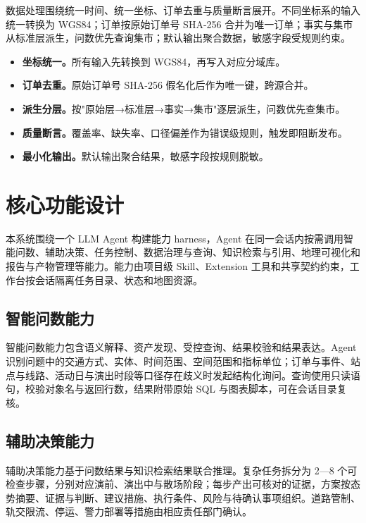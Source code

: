 \documentclass[a4paper,11pt]{article}
\newcommand{\term}[1]{\textbf{#1}}
\begin{document}
数据处理围绕统一时间、统一坐标、订单去重与质量断言展开。不同坐标系的输入统一转换为 WGS84；订单按原始订单号 SHA-256 合并为唯一订单；事实与集市从标准层派生，问数优先查询集市；默认输出聚合数据，敏感字段受规则约束。

\begin{itemize}
  \item \term{坐标统一。}所有输入先转换到 WGS84，再写入对应分域库。
  \item \term{订单去重。}原始订单号 SHA-256 假名化后作为唯一键，跨源合并。
  \item \term{派生分层。}按"原始层→标准层→事实→集市"逐层派生，问数优先查集市。
  \item \term{质量断言。}覆盖率、缺失率、口径偏差作为错误级规则，触发即阻断发布。
  \item \term{最小化输出。}默认输出聚合结果，敏感字段按规则脱敏。
\end{itemize}

\section{核心功能设计}

本系统围绕一个 LLM Agent 构建能力 harness，Agent 在同一会话内按需调用智能问数、辅助决策、任务控制、数据治理与查询、知识检索与引用、地理可视化和报告与产物管理等能力。能力由项目级 Skill、Extension 工具和共享契约约束，工作台按会话隔离任务目录、状态和地图资源。

\subsection{智能问数能力}

智能问数能力包含语义解释、资产发现、受控查询、结果校验和结果表达。Agent 识别问题中的交通方式、实体、时间范围、空间范围和指标单位；订单与事件、站点与线路、活动日与演出时段等口径存在歧义时发起结构化询问。查询使用只读语句，校验对象名与返回行数，结果附带原始 SQL 与图表脚本，可在会话目录复核。

\subsection{辅助决策能力}

辅助决策能力基于问数结果与知识检索结果联合推理。复杂任务拆分为 2—8 个可检查步骤，分别对应演前、演出中与散场阶段；每步产出可核对的证据，方案按态势摘要、证据与判断、建议措施、执行条件、风险与待确认事项组织。道路管制、轨交限流、停运、警力部署等措施由相应责任部门确认。
\end{document}
